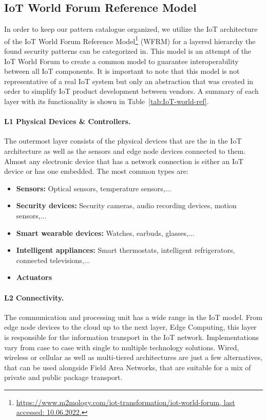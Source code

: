 \subsection{IoT World Forum Reference Model}\label{subsec:model}
In order to keep our pattern catalogue organized, we utilize the IoT architecture of the IoT World Forum Reference Model\footnote{\href{https://www.m2mology.com/iot-transformation/iot-world-forum}{https://www.m2mology.com/iot-transformation/iot-world-forum, last accessed: 10.06.2022.}} (WFRM) for a layered hierarchy the found security patterns can be categorized in. This model is an attempt of the IoT World Forum to create a common model to guarantee interoperability between all IoT components. It is important to note that this model is not representative of a real IoT system but only an abstraction that was created in order to simplify IoT product development between vendors. A summary of each layer with its functionality is shown in Table~\ref{tab:IoT-world-ref}.

\paragraph{L1 Physical Devices \& Controllers.}
The outermost layer consists of the physical devices that are the  in the IoT architecture as well as the sensors and edge node devices connected to them. Almost any electronic device that has a network connection is either an IoT device or has one embedded. The most common types are:

\begin{itemize}
	\item \textbf{Sensors:} Optical sensors, temperature sensors,...
	\item \textbf{Security devices:} Security cameras, audio recording devices, motion sensors,...
	\item \textbf{Smart wearable devices:} Watches, earbuds, glasses,...
	\item \textbf{Intelligent appliances:} Smart thermostats, intelligent refrigerators, connected televisions,...
	\item \textbf{Actuators}
\end{itemize}

\paragraph{L2 Connectivity.}
The communication and processing unit has a wide range in the IoT model. From edge node devices to the cloud up to the next layer, Edge Computing, this layer is responsible for the information transport in the IoT network. Implementations vary from case to case with single to multiple technology solutions. Wired, wireless or cellular as well as multi-tiered architectures are just a few alternatives, that can be used alongside Field Area Networks, that are suitable for a mix of private and public package transport.

